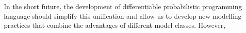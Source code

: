 In the short future, the development of differentiable probabilistic programming language should simplify this unification and allow us to develop new modelling practices that combine the advantages of different model classes. However, 


%
%
%
%
%
%
%
%
%


